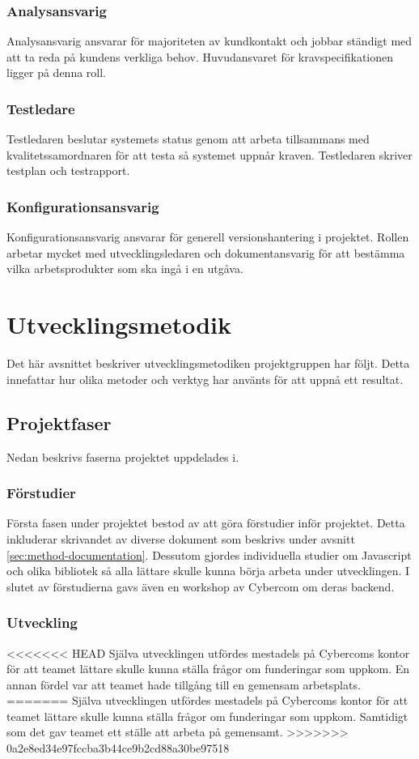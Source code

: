 \subsubsection*{Analysansvarig}
Analysansvarig ansvarar för majoriteten av kundkontakt och jobbar ständigt med att ta reda på kundens verkliga behov. Huvudansvaret för kravspecifikationen ligger på denna roll.

\subsubsection*{Testledare}
Testledaren beslutar systemets status genom att arbeta tillsammans med kvalitetssamordnaren för att testa så systemet uppnår kraven. Testledaren skriver testplan och testrapport.

\subsubsection*{Konfigurationsansvarig}
Konfigurationsansvarig ansvarar för generell versionshantering i projektet. Rollen arbetar mycket med utvecklingsledaren och dokumentansvarig för att bestämma vilka arbetsprodukter som ska ingå i en utgåva.

\section{Utvecklingsmetodik}
Det här avsnittet beskriver utvecklingsmetodiken projektgruppen har följt. Detta innefattar hur olika metoder och verktyg har använts för att uppnå ett resultat.

\subsection{Projektfaser}
Nedan beskrivs faserna projektet uppdelades i.

\subsubsection*{Förstudier}
Första fasen under projektet bestod av att göra förstudier inför projektet. Detta inkluderar skrivandet av diverse dokument som beskrivs under avsnitt \ref{sec:method-documentation}. Dessutom gjordes individuella studier om Javascript och olika bibliotek så alla lättare skulle kunna börja arbeta under utvecklingen. I slutet av förstudierna gavs även en workshop av Cybercom om deras backend.

\subsubsection*{Utveckling}
<<<<<<< HEAD
Själva utvecklingen utfördes mestadels på Cybercoms kontor för att teamet lättare skulle kunna ställa frågor om funderingar som uppkom. En annan fördel var att teamet hade tillgång till en gemensam arbetsplats.
=======
Själva utvecklingen utfördes mestadels på Cybercoms kontor för att teamet lättare skulle kunna ställa frågor om funderingar som uppkom. Samtidigt som det gav teamet ett ställe att arbeta på gemensamt.
>>>>>>> 0a2e8ed34e97fccba3b44ce9b2cd88a30be97518

